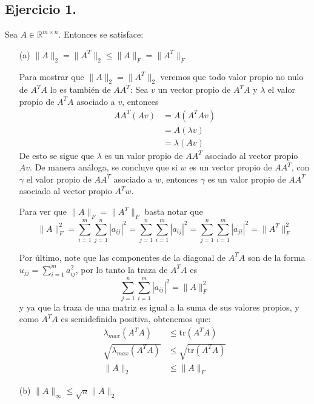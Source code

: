 
\subsection*{Ejercicio 1.}
Sea $A \in \mathbb{R}^{m \times n}$. Entonces se satisface:

\begin{enumerate}
    \item[(a)] $\|A\|_2 = \|A^T\|_2 \leq \|A\|_F = \|A^T\|_F$

    Para mostrar que $\|A\|_2 = \|A^T\|_2$ veremos que todo valor propio no nulo de $A^TA$ lo es también de $AA^T$: Sea $v$ un vector propio de $A^TA$ y $\lambda$ el valor propio de $A^TA$ asociado a $v$, entonces
    \begin{align*}
    AA^T(Av) &= A(A^TAv) \\ 
        & = A(\lambda v) \\ 
        & = \lambda (Av) 
    \end{align*}
    De esto se sigue que $\lambda$ es un valor propio de $AA^T$ asociado al vector propio $Av$. De manera análoga, se concluye que si $w$ es un vector propio de $AA^T$, con $\gamma$ el valor propio de $AA^T$ asociado a $w$, entonces $\gamma$ es un valor propio de $AA^T$ asociado al vector propio $A^Tw$.

    Para ver que $\|A\|_F = \|A^T\|_F$ basta notar que
    \[
    \|A\|_F^2=\sum_{i=1}^{m} \sum_{j=1}^{n} |a_{ij}|^2 = \sum_{j=1}^{n} \sum_{i=1}^m |a_{ij}|^2=\sum_{j=1}^{n} \sum_{i=1}^m |a_{ji}|^2=\|A^T\|_F^2
    \]

    Por último, note que las componentes de la diagonal de $A^TA$ son de la forma $u_{jj}=\sum_{i=1}^m a_{ij}^2$, por lo tanto la traza de $A^TA$ es
    \[
    \sum_{j=1}^n\sum_{i=1}^{m}|a_{ij}|^2=\|A\|_F^2
    \]
    y ya que la traza de una matriz es igual a la suma de sus valores propios, y como $A^TA$ es semidefinida positiva, obtenemos que: 
    \begin{align*}
    \lambda_{max}(A^TA)&\leq \text{tr}(A^TA) \\
    \sqrt{\lambda_{max}(A^TA)} & \leq \sqrt{\text{tr}(A^TA)}\\ 
    \|A\|_2\ & \leq \|A\|_F
    \end{align*}
    \item[(b)] $\|A\|_\infty \leq \sqrt{n} \|A\|_2$


\end{enumerate}
